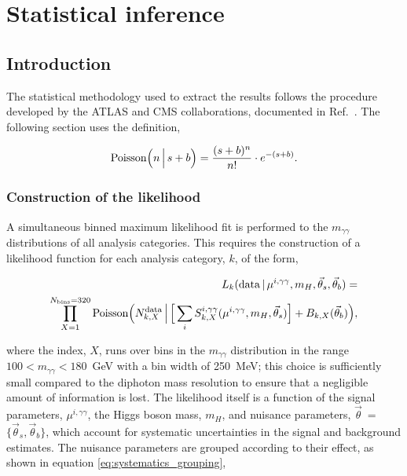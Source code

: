 \chapter{Statistical inference}
\label{chap:hgg_stats}

\section{Introduction}
The statistical methodology used to extract the results follows the procedure developed by the ATLAS and CMS collaborations, documented in Ref.~\cite{Khachatryan:2014jba}. The following section uses the definition,

\begin{equation}\label{eq:poisson_def}
    {\rm{Poisson}}\Big(n\,\Big|\,s+b\Big) = \frac{(s+b)^n}{n!} \cdot e^{-(s+b)}.
\end{equation}

\subsection{Construction of the likelihood}\label{sec:category_likelihood}
A simultaneous binned maximum likelihood fit is performed to the $m_{\gamma\gamma}$ distributions of all analysis categories. This requires the construction of a likelihood function for each analysis category, $k$, of the form,

\begin{equation}\label{eq:category_likelihood}
\begin{split}
    L_k({\rm{data}}\,|\,\mu^{i,\gamma\gamma},m_H,\vec{\theta}_s,\vec{\theta}_b) = \\
    \prod^{N_{\rm{bins}}=320}_{X=1} {\rm{Poisson}} \Big( N_{k,X}^{\rm{data}} \, \Big| \, \Big[ \sum_{i} S_{k,X}^{i,\gamma\gamma}(\mu^{i,\gamma\gamma},m_H,\vec{\theta}_s)\Big] + B_{k,X}(\vec{\theta}_b) \Big),        
\end{split}
\end{equation}


\noindent
where the index, $X$, runs over bins in the $m_{\gamma\gamma}$ distribution in the range $100<m_{\gamma\gamma}<180$~GeV with a bin width of 250~MeV; this choice is sufficiently small compared to the diphoton mass resolution to ensure that a negligible amount of information is lost. The likelihood itself is a function of the signal parameters, $\mu^{i,\gamma\gamma}$, the Higgs boson mass, $m_H$, and nuisance parameters, $\vec{\theta}$~=~$\{\vec{\theta}_s,\vec{\theta}_b\}$, which account for systematic uncertainties in the signal and background estimates. The nuisance parameters are grouped according to their effect, as shown in equation \ref{eq:systematics_grouping},


